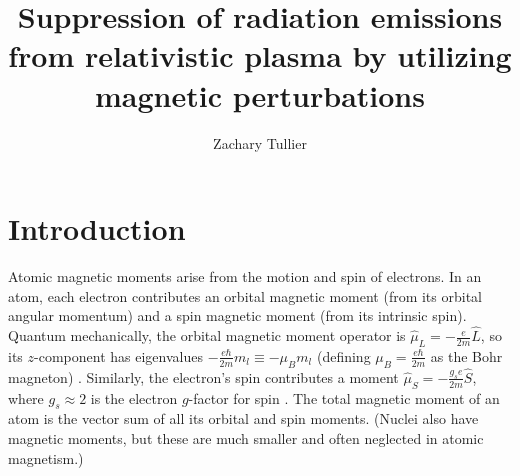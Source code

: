 \documentclass[12pt]{article}
\begin{document}
\singlespacing  %
\title{Suppression of radiation emissions from relativistic plasma by utilizing magnetic perturbations}

\author[1]{Zachary Tullier}
\date{}
\maketitle

\section{Introduction}
    Atomic magnetic moments arise from the motion and spin of electrons. In an atom, each electron contributes an orbital magnetic moment (from its orbital angular momentum) and a spin magnetic moment (from its intrinsic spin). Quantum mechanically, the orbital magnetic moment operator is $\hat{\mu}_L = -\frac{e}{2m}\hat{L}$, so its $z$-component has eigenvalues $- \frac{e\hbar}{2m} m_l \equiv -\mu_B m_l$ (defining $\mu_B = \frac{e\hbar}{2m}$ as the Bohr magneton) \cite{PerturbationTheory}. Similarly, the electron’s spin contributes a moment $\hat{\mu}_S = -\frac{g_s e}{2m}\hat{S}$, where $g_s\approx 2$ is the electron $g$-factor for spin \cite{PerturbationTheory}. The total magnetic moment of an atom is the vector sum of all its orbital and spin moments. (Nuclei also have magnetic moments, but these are much smaller and often neglected in atomic magnetism.)
\end{document}
